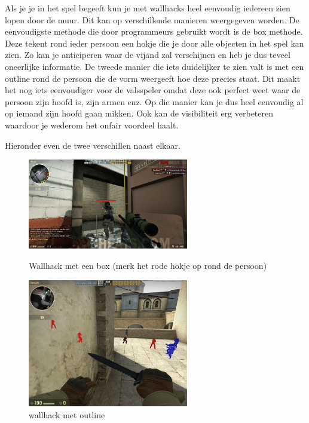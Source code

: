 \documentclass[pdftex,a4paper,12pt,twoside]{report}
\begin{document}
Als je je in het spel begeeft kun je met wallhacks heel eenvoudig iedereen zien lopen door de muur. Dit kan op verschillende manieren weergegeven worden. De eenvoudigste methode die door programmeurs gebruikt wordt is de box methode. Deze tekent rond ieder persoon een hokje die je door alle objecten in het spel kan zien. Zo kan je anticiperen waar de vijand zal verschijnen en heb je dus teveel oneerlijke informatie. 
De tweede manier die iets duidelijker te zien valt is met een outline rond de persoon die de vorm weergeeft hoe deze precies staat. Dit maakt het nog iets eenvoudiger voor de valsspeler omdat deze ook perfect weet waar de persoon zijn hoofd is, zijn armen enz. Op die manier kan je dus heel eenvoudig al op iemand zijn hoofd gaan mikken. Ook kan de visibiliteit erg verbeteren waardoor je wederom het onfair voordeel haalt.

Hieronder even de twee verschillen naast elkaar.


\begin{figure}[H]
\centering
\begin{minipage}{0.48\textwidth}
\centering
\includegraphics[width=7cm]{img/wallhack-example-box}
\caption{Wallhack met een box (merk het rode hokje op rond de persoon)}
\end{minipage}\hfill
\begin{minipage}{0.48\textwidth}
\centering
\includegraphics[width=7cm]{img/wallhack-example-outline}
\caption{wallhack met outline}
\end{minipage}
\end{figure}  
\end{document}
